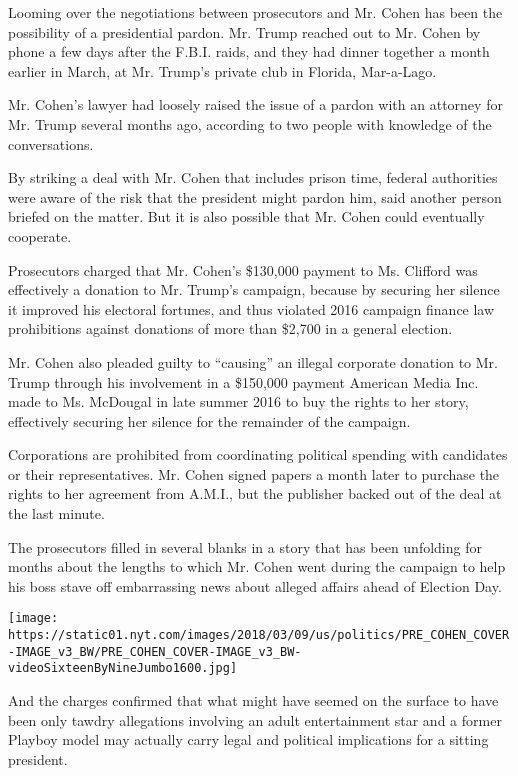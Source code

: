 Looming over the negotiations between prosecutors and Mr. Cohen has been
the possibility of a presidential pardon. Mr. Trump reached out to Mr.
Cohen by phone a few days after the F.B.I. raids, and they had dinner
together a month earlier in March, at Mr. Trump's private club in
Florida, Mar-a-Lago.

Mr. Cohen's lawyer had loosely raised the issue of a pardon with an
attorney for Mr. Trump several months ago, according to two people with
knowledge of the conversations.

By striking a deal with Mr. Cohen that includes prison time, federal
authorities were aware of the risk that the president might pardon him,
said another person briefed on the matter. But it is also possible that
Mr. Cohen could eventually cooperate.

Prosecutors charged that Mr. Cohen's \$130,000 payment to Ms. Clifford
was effectively a donation to Mr. Trump's campaign, because by securing
her silence it improved his electoral fortunes, and thus violated 2016
campaign finance law prohibitions against donations of more than \$2,700
in a general election.

Mr. Cohen also pleaded guilty to ``causing'' an illegal corporate
donation to Mr. Trump through his involvement in a \$150,000 payment
American Media Inc. made to Ms. McDougal in late summer 2016 to buy the
rights to her story, effectively securing her silence for the remainder
of the campaign.

Corporations are prohibited from coordinating political spending with
candidates or their representatives. Mr. Cohen signed papers a month
later to purchase the rights to her agreement from A.M.I., but the
publisher backed out of the deal at the last minute.

The prosecutors filled in several blanks in a story that has been
unfolding for months about the lengths to which Mr. Cohen went during
the campaign to help his boss stave off embarrassing news about alleged
affairs ahead of Election Day.

\texttt{[image: https://static01.nyt.com/images/2018/03/09/us/politics/PRE\_COHEN\_COVER-IMAGE\_v3\_BW/PRE\_COHEN\_COVER-IMAGE\_v3\_BW-videoSixteenByNineJumbo1600.jpg]}

And the charges confirmed that what might have seemed on the surface to
have been only tawdry allegations involving an adult entertainment star
and a former Playboy model may actually carry legal and political
implications for a sitting president.


